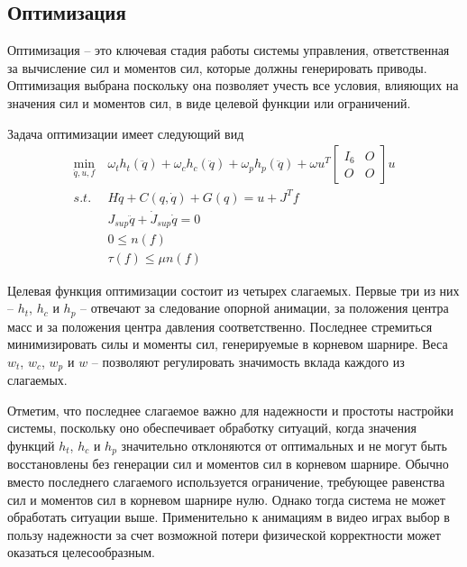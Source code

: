 \subsection{Оптимизация}

Оптимизация -- это ключевая стадия работы системы управления, ответственная за вычисление сил и моментов сил, которые должны генерировать приводы. Оптимизация выбрана поскольку она позволяет учесть все условия, влияющих на значения сил и моментов сил, в виде целевой функции или ограничений.

Задача оптимизации имеет следующий вид
\begin{align*}
  \min_{\ddot{q}, u, f} &\ \omega_{t} h_{t}(\ddot{q}) + \omega_{c} h_{c}(\ddot{q}) + \omega_{p} h_{p}(\ddot{q}) + \omega u^{T} \begin{bmatrix} I_{6} & O \\ O & O \end{bmatrix} u \\
  s.t. &\ H \ddot{q} + C(q, \dot{q}) + G(q) = u + J^{T} f \tag{2.1}\label{eq:2.1} \\
       &\ J_{sup} \ddot{q} + \dot{J}_{sup} \dot{q} = 0 \tag{2.2}\label{eq:2.2} \\
       &\ 0 \le n(f) \tag{2.3}\label{ineq:2.3} \\
       &\ \tau(f) \le \mu n(f) \tag{2.4}\label{ineq:2.4}
\end{align*}

Целевая функция оптимизации состоит из четырех слагаемых. Первые три из них -- $h_{t}$, $h_{c}$ и $h_{p}$ -- отвечают за следование опорной анимации, за положения центра масс и за положения центра давления соответственно. Последнее стремиться минимизировать силы и моменты сил, генерируемые в корневом шарнире. Веса $w_{t}$, $w_{c}$, $w_{p}$ и $w$ -- позволяют регулировать значимость вклада каждого из слагаемых.

Отметим, что последнее слагаемое важно для надежности и простоты настройки системы, поскольку оно обеспечивает обработку ситуаций, когда значения функций $h_{t}$, $h_{c}$ и $h_{p}$ значительно отклоняются от оптимальных и не могут быть восстановлены без генерации сил и моментов сил в корневом шарнире. Обычно вместо последнего слагаемого используется ограничение, требующее равенства сил и моментов сил в корневом шарнире нулю. Однако тогда система не может обработать ситуации выше. Применительно к анимациям в видео играх выбор в пользу надежности за счет возможной потери физической корректности может оказаться целесообразным.

